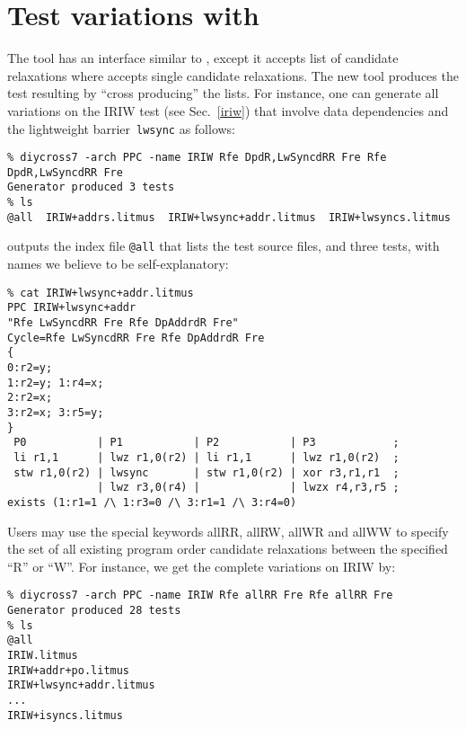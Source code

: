\section{Test\label{diycross:intro} variations with \diycross{}}
The tool \diycross{} has an interface similar to \diyone,
except it accepts list of candidate relaxations where \diyone{} accepts
single candidate relaxations.
The new tool produces the test resulting by ``cross producing'' the lists.
For instance, one can generate all variations on the IRIW test
(see Sec.~\ref{iriw}) that
involve data dependencies and the lightweight barrier~\texttt{lwsync}
as follows:
\begin{verbatim}
% diycross7 -arch PPC -name IRIW Rfe DpdR,LwSyncdRR Fre Rfe DpdR,LwSyncdRR Fre
Generator produced 3 tests
% ls
@all  IRIW+addrs.litmus  IRIW+lwsync+addr.litmus  IRIW+lwsyncs.litmus
\end{verbatim}
\diycross{} outputs the index file \texttt{@all}
that lists the test source files, and three tests, with
names we believe to be self-explanatory:
\begin{verbatim}
% cat IRIW+lwsync+addr.litmus
PPC IRIW+lwsync+addr
"Rfe LwSyncdRR Fre Rfe DpAddrdR Fre"
Cycle=Rfe LwSyncdRR Fre Rfe DpAddrdR Fre
{
0:r2=y;
1:r2=y; 1:r4=x;
2:r2=x;
3:r2=x; 3:r5=y;
}
 P0           | P1           | P2           | P3            ;
 li r1,1      | lwz r1,0(r2) | li r1,1      | lwz r1,0(r2)  ;
 stw r1,0(r2) | lwsync       | stw r1,0(r2) | xor r3,r1,r1  ;
              | lwz r3,0(r4) |              | lwzx r4,r3,r5 ;
exists (1:r1=1 /\ 1:r3=0 /\ 3:r1=1 /\ 3:r4=0)
\end{verbatim}

Users may use the special keywords allRR, allRW, allWR and allWW to
specify the set of all existing program order candidate relaxations
between the specified ``R'' or ``W''. For instance, we get the complete
variations on IRIW by:
\begin{verbatim}
% diycross7 -arch PPC -name IRIW Rfe allRR Fre Rfe allRR Fre
Generator produced 28 tests
% ls
@all
IRIW.litmus
IRIW+addr+po.litmus
IRIW+lwsync+addr.litmus
...
IRIW+isyncs.litmus
\end{verbatim}

